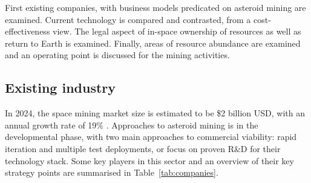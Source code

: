 \documentclass[conference]{IEEEtran}
\begin{document}
First existing companies, with business models predicated on asteroid mining are examined. Current technology is compared and contrasted, from a cost-effectiveness view. The legal aspect of in-space ownership of resources as well as return to Earth is examined. Finally, areas of resource abundance are examined and an operating point is discussed for the mining activities.

\subsection{Existing industry}
In 2024, the space mining market size is estimated to be \$2 billion USD, with an annual growth rate of 19\% \cite{space-mining-insights}\cite{asteroid-mining-market}. Approaches to asteroid mining is in the developmental phase, with two main approaches to commercial viability: rapid iteration and multiple test deployments, or focus on proven R\&D for their technology stack. Some key players in this sector and an overview of their key strategy points are summarised in Table~\ref{tab:companies}.
\end{document}
